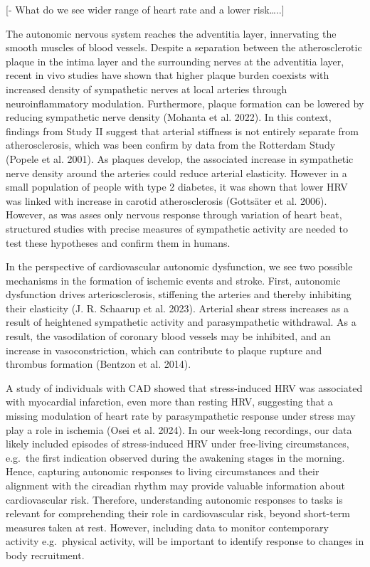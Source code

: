 \documentclass[
  a4paper,
  headsepline=true,
  open=any]{scrbook}
\begin{document}
{[}- What do we see wider range of heart rate and a lower
risk\ldots..{]}

The autonomic nervous system reaches the adventitia layer, innervating
the smooth muscles of blood vessels. Despite a separation between the
atherosclerotic plaque in the intima layer and the surrounding nerves at
the adventitia layer, recent in vivo studies have shown that higher
plaque burden coexists with increased density of sympathetic nerves at
local arteries through neuroinflammatory modulation. Furthermore, plaque
formation can be lowered by reducing sympathetic nerve density (Mohanta
et al. 2022). In this context, findings from Study II suggest that
arterial stiffness is not entirely separate from atherosclerosis, which
was been confirm by data from the Rotterdam Study (Popele et al. 2001).
As plaques develop, the associated increase in sympathetic nerve density
around the arteries could reduce arterial elasticity. However in a small
population of people with type 2 diabetes, it was shown that lower HRV
was linked with increase in carotid atherosclerosis (Gottsäter et al.
2006). However, as was asses only nervous response through variation of
heart beat, structured studies with precise measures of sympathetic
activity are needed to test these hypotheses and confirm them in humans.

In the perspective of cardiovascular autonomic dysfunction, we see two
possible mechanisms in the formation of ischemic events and stroke.
First, autonomic dysfunction drives arteriosclerosis, stiffening the
arteries and thereby inhibiting their elasticity (J. R. Schaarup et al.
2023). Arterial shear stress increases as a result of heightened
sympathetic activity and parasympathetic withdrawal. As a result, the
vasodilation of coronary blood vessels may be inhibited, and an increase
in vasoconstriction, which can contribute to plaque rupture and thrombus
formation (Bentzon et al. 2014).

A study of individuals with CAD showed that stress-induced HRV was
associated with myocardial infarction, even more than resting HRV,
suggesting that a missing modulation of heart rate by parasympathetic
response under stress may play a role in ischemia (Osei et al. 2024). In
our week-long recordings, our data likely included episodes of
stress-induced HRV under free-living circumstances, e.g.~the first
indication observed during the awakening stages in the morning. Hence,
capturing autonomic responses to living circumstances and their
alignment with the circadian rhythm may provide valuable information
about cardiovascular risk. Therefore, understanding autonomic responses
to tasks is relevant for comprehending their role in cardiovascular
risk, beyond short-term measures taken at rest. However, including data
to monitor contemporary activity e.g.~physical activity, will be
important to identify response to changes in body recruitment.
\end{document}
